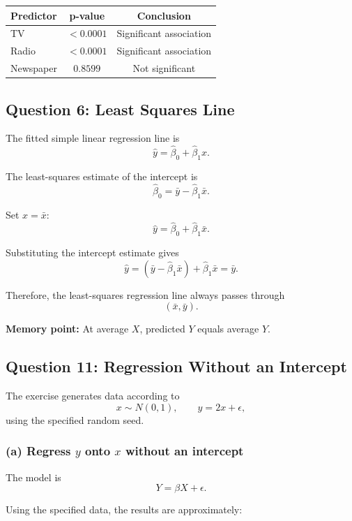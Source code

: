 \documentclass[12pt,a4paper]{article}
\begin{document}
\begin{center}
\begin{tabular}{lcc}
\toprule
Predictor & p-value & Conclusion\\
\midrule
TV & $<0.0001$ & Significant association\\
Radio & $<0.0001$ & Significant association\\
Newspaper & $0.8599$ & Not significant\\
\bottomrule
\end{tabular}
\end{center}

\newpage

\subsection*{Question 6: Least Squares Line}

The fitted simple linear regression line is
\[
\hat{y}=\hat{\beta}_0+\hat{\beta}_1x.
\]

The least-squares estimate of the intercept is
\[
\hat{\beta}_0=\bar{y}-\hat{\beta}_1\bar{x}.
\]

Set $x=\bar{x}$:
\[
\hat{y}
=
\hat{\beta}_0+\hat{\beta}_1\bar{x}.
\]

Substituting the intercept estimate gives
\[
\hat{y}
=
(\bar{y}-\hat{\beta}_1\bar{x})
+\hat{\beta}_1\bar{x}
=
\bar{y}.
\]

Therefore, the least-squares regression line always passes through
\[
\boxed{(\bar{x},\bar{y})}.
\]

\textbf{Memory point:} At average $X$, predicted $Y$ equals average $Y$.

\newpage

\subsection*{Question 11: Regression Without an Intercept}

The exercise generates data according to
\[
x\sim N(0,1),\qquad y=2x+\epsilon,
\]
using the specified random seed.

\subsubsection*{(a) Regress $y$ onto $x$ without an intercept}

The model is
\[
Y=\beta X+\epsilon.
\]

Using the specified data, the results are approximately:
\end{document}
